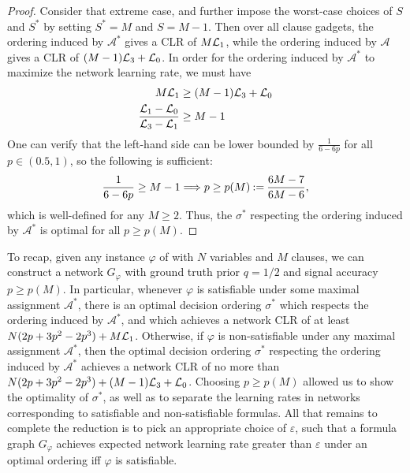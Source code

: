 \begin{proof}
    Consider that extreme case, and further impose the worst-case choices of $S$ and $S^*$ by setting $S^* = M$ and $S = M-1$. Then over all clause gadgets, the ordering induced by $\mathcal{A}^*$ gives a CLR of $M \mathcal{L}_1$, while the ordering induced by $\mathcal{A}$ gives a CLR of $(M-1) \mathcal{L}_3 + \mathcal{L}_0$. In order for the ordering induced by $\mathcal{A}^*$ to maximize the network learning rate, we must have
    \begin{align*}
        M \mathcal{L}_1 &\geq (M-1) \mathcal{L}_3 + \mathcal{L}_0\\
        \frac{\mathcal{L}_1 - \mathcal{L}_0}{\mathcal{L}_3 - \mathcal{L}_1} &\geq M-1
    \end{align*}
    One can verify that the left-hand side can be lower bounded by $\frac{1}{6-6p}$ for all $p \in (0.5,1)$, so the following is sufficient:
    \begin{align*}
        \frac{1}{6-6p} \geq M-1 \Longrightarrow p \geq p(M) \mathbin{:=} \frac{6M-7}{6M-6},
    \end{align*}
    which is well-defined for any $M \geq 2$. Thus, the $\sigma^*$ respecting the ordering induced by $\mathcal{A}^*$ is optimal for all $p \geq p(M)$.
\end{proof}

To recap, given any instance $\varphi$ of \sat{} with $N$ variables and $M$ clauses, we can construct a network $G_\varphi$ with ground truth prior $q = 1/2$ and signal accuracy $p \geq p(M)$. In particular, whenever $\varphi$ is satisfiable under some maximal assignment $\mathcal{A}^*$, there is an optimal decision ordering $\sigma^*$ which respects the ordering induced by $\mathcal{A}^*$, and which achieves a network CLR of at least $N(2p+3p^2-2p^3) + M\mathcal{L}_1$. Otherwise, if $\varphi$ is non-satisfiable under any maximal assignment $\mathcal{A}^*$, then the optimal decision ordering $\sigma^*$ respecting the ordering induced by $\mathcal{A}^*$ achieves a network CLR of no more than $N(2p+3p^2-2p^3) + (M-1)\mathcal{L}_3 + \mathcal{L}_0$. Choosing $p \geq p(M)$ allowed us to show the optimality of $\sigma^*$, as well as to separate the learning rates in networks corresponding to satisfiable and non-satisfiable formulas. All that remains to complete the reduction is to pick an appropriate choice of $\varepsilon$, such that a formula graph $G_\varphi$ achieves expected network learning rate greater than $\varepsilon$ under an optimal ordering iff $\varphi$ is satisfiable.

